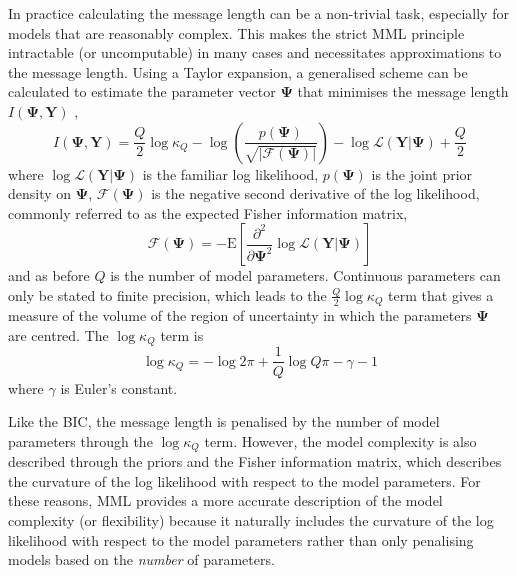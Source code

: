 \documentclass[twocolumn]{aastex62}
\newcommand{\todo}[1]{\textcolor{red}{#1}}
\newcommand{\vect}[1]{\boldsymbol{\mathbf{#1}}}
\renewcommand{\vec}[1]{\vect{#1}}
\newcommand{\data}{\textbf{Y}}
\newcommand{\vecdata}{\vec\data}
\newcommand{\likelihood}{\mathcal{L}}
\begin{document}
In practice calculating the message length can be a non-trivial task, 
especially for models that are reasonably complex. This makes the strict MML
principle intractable (or uncomputable) in many cases and necessitates
approximations to the message length. Using a Taylor expansion, a generalised
scheme can be calculated to estimate the parameter vector $\vec\Psi$ that
minimises the message length ${I}(\vec\Psi,\vecdata)$ \citep{Wallace:1987},
\begin{equation}
	{I}(\vec\Psi,\vecdata) = \frac{Q}{2}\log\kappa_Q - \log\left(\frac{p(\vec\Psi)}{\sqrt{|\mathcal{F}(\vec\Psi)|}}\right) - \log\mathcal{L}\left(\vecdata|\vec\Psi\right) + \frac{Q}{2} \label{eq:mml} 
\end{equation}
\noindent{}where $\log\likelihood(\vecdata|\vec\Psi)$ is the familiar
log likelihood, $p(\vec\Psi)$ is the joint prior density on $\vec\Psi$,
$\mathcal{F}(\vec\Psi)$ is the negative second derivative of the log likelihood,
commonly referred to as the expected Fisher information matrix,
\begin{equation}
	\mathcal{F}(\vec\Psi) = -\textrm{E}\left[\frac{\partial^2}{\partial\vec\Psi^2}\log\likelihood(\vecdata|\vec\Psi)\right]
\end{equation}
\noindent{}and as before $Q$ is the number of model parameters.
Continuous parameters can only be stated to finite precision, which leads
to the $\frac{Q}{2}\log\kappa_Q$ term that gives a measure of the volume of the region of
uncertainty in which the parameters $\vec\Psi$ are centred. The $\log\kappa_Q$
term is
\begin{equation}
	\log\kappa_Q = -\log{2\pi} + \frac{1}{Q}\log{Q\pi} - \gamma - 1
\end{equation}
\noindent{}where $\gamma$ is Euler's constant.

Like the BIC, the message length is penalised by the number of model parameters
through the $\log\kappa_Q$ term. However, the model complexity is also 
described through the priors and the Fisher information matrix, which
describes the curvature of the log likelihood with respect to the model
parameters. For these reasons, MML provides a more accurate description of
the model complexity (or flexibility) because it naturally includes the 
curvature of the log likelihood with respect to the model parameters
rather than only penalising models based on the \emph{number} of
parameters.

\end{document}
